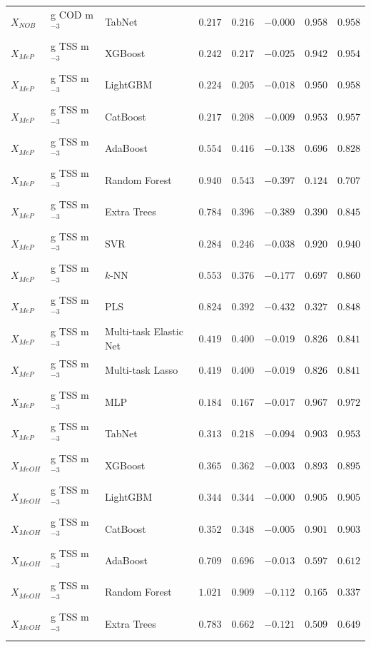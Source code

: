 \begin{longtable}{llp{3.1cm}rrrrr}
$X_{NOB}$ & g COD m$^{-3}$ & TabNet & $0.217$ & $0.216$ & $-0.000$ & $0.958$ & $0.958$ \\
$X_{MeP}$ & g TSS m$^{-3}$ & XGBoost & $0.242$ & $0.217$ & $-0.025$ & $0.942$ & $0.954$ \\
$X_{MeP}$ & g TSS m$^{-3}$ & LightGBM & $0.224$ & $0.205$ & $-0.018$ & $0.950$ & $0.958$ \\
$X_{MeP}$ & g TSS m$^{-3}$ & CatBoost & $0.217$ & $0.208$ & $-0.009$ & $0.953$ & $0.957$ \\
$X_{MeP}$ & g TSS m$^{-3}$ & AdaBoost & $0.554$ & $0.416$ & $-0.138$ & $0.696$ & $0.828$ \\
$X_{MeP}$ & g TSS m$^{-3}$ & Random Forest & $0.940$ & $0.543$ & $-0.397$ & $0.124$ & $0.707$ \\
$X_{MeP}$ & g TSS m$^{-3}$ & Extra Trees & $0.784$ & $0.396$ & $-0.389$ & $0.390$ & $0.845$ \\
$X_{MeP}$ & g TSS m$^{-3}$ & SVR & $0.284$ & $0.246$ & $-0.038$ & $0.920$ & $0.940$ \\
$X_{MeP}$ & g TSS m$^{-3}$ & $k$-NN & $0.553$ & $0.376$ & $-0.177$ & $0.697$ & $0.860$ \\
$X_{MeP}$ & g TSS m$^{-3}$ & PLS & $0.824$ & $0.392$ & $-0.432$ & $0.327$ & $0.848$ \\
$X_{MeP}$ & g TSS m$^{-3}$ & Multi-task Elastic Net & $0.419$ & $0.400$ & $-0.019$ & $0.826$ & $0.841$ \\
$X_{MeP}$ & g TSS m$^{-3}$ & Multi-task Lasso & $0.419$ & $0.400$ & $-0.019$ & $0.826$ & $0.841$ \\
$X_{MeP}$ & g TSS m$^{-3}$ & MLP & $0.184$ & $0.167$ & $-0.017$ & $0.967$ & $0.972$ \\
$X_{MeP}$ & g TSS m$^{-3}$ & TabNet & $0.313$ & $0.218$ & $-0.094$ & $0.903$ & $0.953$ \\
$X_{MeOH}$ & g TSS m$^{-3}$ & XGBoost & $0.365$ & $0.362$ & $-0.003$ & $0.893$ & $0.895$ \\
$X_{MeOH}$ & g TSS m$^{-3}$ & LightGBM & $0.344$ & $0.344$ & $-0.000$ & $0.905$ & $0.905$ \\
$X_{MeOH}$ & g TSS m$^{-3}$ & CatBoost & $0.352$ & $0.348$ & $-0.005$ & $0.901$ & $0.903$ \\
$X_{MeOH}$ & g TSS m$^{-3}$ & AdaBoost & $0.709$ & $0.696$ & $-0.013$ & $0.597$ & $0.612$ \\
$X_{MeOH}$ & g TSS m$^{-3}$ & Random Forest & $1.021$ & $0.909$ & $-0.112$ & $0.165$ & $0.337$ \\
$X_{MeOH}$ & g TSS m$^{-3}$ & Extra Trees & $0.783$ & $0.662$ & $-0.121$ & $0.509$ & $0.649$ \\

\end{longtable}
